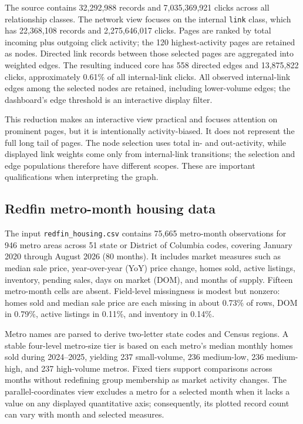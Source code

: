 \documentclass[11pt,letterpaper]{article}
\begin{document}
The source contains 32,292,988 records and 7,035,369,921 clicks across all relationship classes. The network view focuses on the internal \texttt{link} class, which has 22,368,108 records and 2,275,646,017 clicks. Pages are ranked by total incoming plus outgoing click activity; the 120 highest-activity pages are retained as nodes. Directed link records between those selected pages are aggregated into weighted edges. The resulting induced core has 558 directed edges and 13,875,822 clicks, approximately 0.61\% of all internal-link clicks. All observed internal-link edges among the selected nodes are retained, including lower-volume edges; the dashboard's edge threshold is an interactive display filter.

This reduction makes an interactive view practical and focuses attention on prominent pages, but it is intentionally activity-biased. It does not represent the full long tail of pages. The node selection uses total in- and out-activity, while displayed link weights come only from internal-link transitions; the selection and edge populations therefore have different scopes. These are important qualifications when interpreting the graph.

\subsection{Redfin metro-month housing data}
The input \texttt{redfin\_housing.csv} contains 75,665 metro-month observations for 946 metro areas across 51 state or District of Columbia codes, covering January 2020 through August 2026 (80 months). It includes market measures such as median sale price, year-over-year (YoY) price change, homes sold, active listings, inventory, pending sales, days on market (DOM), and months of supply. Fifteen metro-month cells are absent. Field-level missingness is modest but nonzero: homes sold and median sale price are each missing in about 0.73\% of rows, DOM in 0.79\%, active listings in 0.11\%, and inventory in 0.14\%.

Metro names are parsed to derive two-letter state codes and Census regions. A stable four-level metro-size tier is based on each metro's median monthly homes sold during 2024--2025, yielding 237 small-volume, 236 medium-low, 236 medium-high, and 237 high-volume metros. Fixed tiers support comparisons across months without redefining group membership as market activity changes. The parallel-coordinates view excludes a metro for a selected month when it lacks a value on any displayed quantitative axis; consequently, its plotted record count can vary with month and selected measures.
\end{document}
